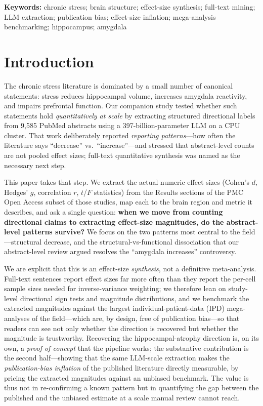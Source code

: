 \documentclass[11pt]{article}
\begin{document}
\medskip
\noindent\textbf{Keywords:} chronic stress; brain structure; effect-size
synthesis; full-text mining; LLM extraction; publication bias; effect-size
inflation; mega-analysis benchmarking; hippocampus; amygdala

\section{Introduction}

The chronic stress literature is dominated by a small number of canonical
statements: stress reduces hippocampal volume, increases amygdala reactivity,
and impairs prefrontal function. Our companion study \cite{kang2026scoping}
tested whether such statements hold \emph{quantitatively at scale} by extracting
structured directional labels from 9{,}585 PubMed abstracts using a
397-billion-parameter LLM on a CPU cluster. That work deliberately reported
\emph{reporting patterns}---how often the literature says ``decrease'' vs.\
``increase''---and stressed that abstract-level counts are not pooled effect
sizes; full-text quantitative synthesis was named as the necessary next step.

This paper takes that step. We extract the actual numeric effect sizes (Cohen's
$d$, Hedges' $g$, correlation $r$, $t$/$F$ statistics) from the Results sections
of the PMC Open Access subset of those studies, map each to the brain region and
metric it describes, and ask a single question: \textbf{when we move from
counting directional claims to extracting effect-size magnitudes, do the
abstract-level patterns survive?} We focus on the two patterns most central to
the field---structural decrease, and the structural-vs-functional dissociation
that our abstract-level review argued resolves the ``amygdala increases''
controversy.

We are explicit that this is an effect-size \emph{synthesis}, not a definitive
meta-analysis. Full-text sentences report effect sizes far more often than they
report the per-cell sample sizes needed for inverse-variance weighting; we
therefore lean on study-level directional sign tests and magnitude
distributions, and we benchmark the extracted magnitudes against the largest
individual-patient-data (IPD) mega-analyses of the field---which are, by design,
free of publication bias---so that readers can see not only whether the
direction is recovered but whether the magnitude is trustworthy. Recovering the
hippocampal-atrophy direction is, on its own, a \emph{proof of concept} that the
pipeline works; the substantive contribution is the second half---showing that
the same LLM-scale extraction makes the \emph{publication-bias inflation} of the
published literature directly measurable, by pricing the extracted magnitudes
against an unbiased benchmark. The value is thus not in re-confirming a known
pattern but in quantifying the gap between the published and the unbiased
estimate at a scale manual review cannot reach.
\end{document}
